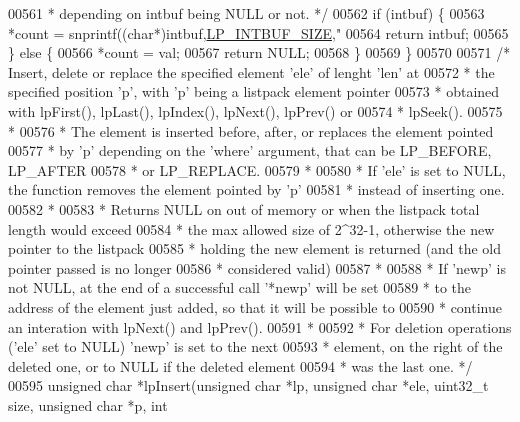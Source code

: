 \begin{DoxyCode}
00561 \textcolor{comment}{     * depending on intbuf being NULL or not. */}
00562     \textcolor{keywordflow}{if} (intbuf) \{
00563         *count = snprintf((\textcolor{keywordtype}{char}*)intbuf,\hyperlink{listpack_8h_ab31e5c173b595ae4e703b72eb435a6e9}{LP\_INTBUF\_SIZE},\textcolor{stringliteral}{"%
00564         \textcolor{keywordflow}{return} intbuf;
00565     \} \textcolor{keywordflow}{else} \{
00566         *count = val;
00567         \textcolor{keywordflow}{return} NULL;
00568     \}
00569 \}
00570 
00571 \textcolor{comment}{/* Insert, delete or replace the specified element 'ele' of lenght 'len' at}
00572 \textcolor{comment}{ * the specified position 'p', with 'p' being a listpack element pointer}
00573 \textcolor{comment}{ * obtained with lpFirst(), lpLast(), lpIndex(), lpNext(), lpPrev() or}
00574 \textcolor{comment}{ * lpSeek().}
00575 \textcolor{comment}{ *}
00576 \textcolor{comment}{ * The element is inserted before, after, or replaces the element pointed}
00577 \textcolor{comment}{ * by 'p' depending on the 'where' argument, that can be LP\_BEFORE, LP\_AFTER}
00578 \textcolor{comment}{ * or LP\_REPLACE.}
00579 \textcolor{comment}{ *}
00580 \textcolor{comment}{ * If 'ele' is set to NULL, the function removes the element pointed by 'p'}
00581 \textcolor{comment}{ * instead of inserting one.}
00582 \textcolor{comment}{ *}
00583 \textcolor{comment}{ * Returns NULL on out of memory or when the listpack total length would exceed}
00584 \textcolor{comment}{ * the max allowed size of 2^32-1, otherwise the new pointer to the listpack}
00585 \textcolor{comment}{ * holding the new element is returned (and the old pointer passed is no longer}
00586 \textcolor{comment}{ * considered valid)}
00587 \textcolor{comment}{ *}
00588 \textcolor{comment}{ * If 'newp' is not NULL, at the end of a successful call '*newp' will be set}
00589 \textcolor{comment}{ * to the address of the element just added, so that it will be possible to}
00590 \textcolor{comment}{ * continue an interation with lpNext() and lpPrev().}
00591 \textcolor{comment}{ *}
00592 \textcolor{comment}{ * For deletion operations ('ele' set to NULL) 'newp' is set to the next}
00593 \textcolor{comment}{ * element, on the right of the deleted one, or to NULL if the deleted element}
00594 \textcolor{comment}{ * was the last one. */}
00595 \textcolor{keywordtype}{unsigned} \textcolor{keywordtype}{char} *lpInsert(\textcolor{keywordtype}{unsigned} \textcolor{keywordtype}{char} *lp, \textcolor{keywordtype}{unsigned} \textcolor{keywordtype}{char} *ele, uint32\_t size, \textcolor{keywordtype}{unsigned} \textcolor{keywordtype}{char} *p, \textcolor{keywordtype}{int} 
}
\end{DoxyCode}
